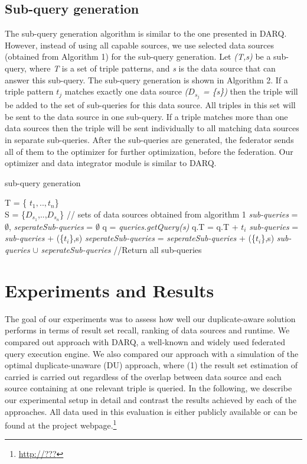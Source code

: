 \documentclass{sig-alternate}  %
\begin{document}
\subsection{Sub-query generation}
 The sub-query generation algorithm is similar to the one presented in DARQ. However, instead of using all capable sources, we use selected data sources (obtained from Algorithm 1) for the sub-query generation. Let \emph{(T,s)} be a sub-query, where \emph{T} is a set of triple patterns, and \emph{s} is the data source that can answer this sub-query. The sub-query generation is shown in Algorithm 2. If a triple pattern \emph{$t_j$} matches exactly one data source \emph{($D_{s_j}$ = \{s\})} then the triple will be added to the set of sub-queries for this data source. All triples in this set will be sent to the data source in one sub-query. If a triple matches more than one data sources then the triple will be sent individually to all matching data sources
in separate sub-queries. After the sub-queries are generated, the federator sends all of them to the optimizer for further optimization, before the federation. Our optimizer and data integrator module is similar to DARQ. 
\begin{algorithm}
\caption{sub-query generation}
\begin{algorithmic} [1]
\REQUIRE T = \{ $t_1,..,t_n$\} \\
 S = \{$D_{s_1}$,..,$D_{s_n}$\} // sets of data sources obtained from algorithm 1  
\STATE \emph{sub-queries} = $\emptyset$, \emph{seperateSub-queries} = $\emptyset$
\STATE q = \emph{queries.getQuery(s)}
\STATE q.T = q.T + $t_i$
\ELSE 
\STATE \emph{sub-queries} = \emph{sub-queries} + (\{$t_i$\},s)
\ENDIF
\ELSE 
{}
\STATE \emph{seperateSub-queries} = \emph{seperateSub-queries} + (\{$t_i$\},s)
\ENDFOR
\ENDIF
\ENDFOR
\RETURN \emph{sub-queries} $\cup$ \emph{seperateSub-queries} //Return all sub-queries
\end{algorithmic}
\end{algorithm}
\section{Experiments and Results}
The goal of our experiments was to assess how well our duplicate-aware solution performs in terms of result set recall, ranking of data sources and runtime.
We compared out approach with DARQ, a well-known and widely used federated query execution engine.
We also compared our approach with a simulation of the optimal duplicate-unaware (DU) approach, where (1) the result set estimation of carried is carried out regardless of the overlap between data source and each source containing at one relevant triple is queried.
In the following, we describe our experimental setup in detail and contrast the results achieved by each of the approaches.
All data used in this evaluation is either publicly available or can be found at the project webpage.\footnote{\url{http://???}}
\end{document}
